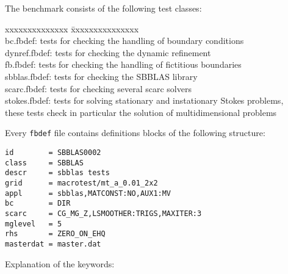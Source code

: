 The benchmark consists of the following test classes:

\begin{tabbing}
xxxxxxxxxxxxxx \=  xxxxxxxxxxxxxxx \kill \\
bc.fbdef: \>      tests for checking the handling of boundary conditions \\
dynref.fbdef: \>  tests for checking the dynamic refinement \\
fb.fbdef: \>      tests for checking the handling of fictitious boundaries \\
sbblas.fbdef: \>  tests for checking the SBBLAS library \\
scarc.fbdef: \>   tests for checking several scarc solvers \\
stokes.fbdef: \>  tests for solving stationary and instationary Stokes problems, \\
               \> these tests check in particular the solution of multidimensional problems \\
\end{tabbing}


Every \texttt{fbdef} file contains definitions blocks of the following structure:

\begin{verbatim}
id        = SBBLAS0002
class     = SBBLAS
descr     = sbblas tests
grid      = macrotest/mt_a_0.01_2x2
appl      = sbblas,MATCONST:NO,AUX1:MV
bc        = DIR
scarc     = CG_MG_Z,LSMOOTHER:TRIGS,MAXITER:3
mglevel   = 5
rhs       = ZERO_ON_EHQ
masterdat = master.dat
\end{verbatim}

Explanation of the keywords:

